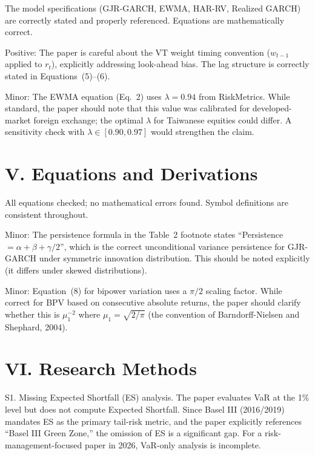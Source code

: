 \documentclass[12pt,a4paper]{article}
\begin{document}
The model specifications (GJR-GARCH, EWMA, HAR-RV, Realized GARCH) are correctly stated and properly referenced. Equations are mathematically correct.

\textcolor{okgreen}{Positive:} The paper is careful about the VT weight timing convention ($w_{t-1}$ applied to $r_t$), explicitly addressing look-ahead bias. The lag structure is correctly stated in Equations~(5)--(6).

Minor: The EWMA equation (Eq.~2) uses $\lambda = 0.94$ from RiskMetrics. While standard, the paper should note that this value was calibrated for developed-market foreign exchange; the optimal $\lambda$ for Taiwanese equities could differ. A sensitivity check with $\lambda \in [0.90, 0.97]$ would strengthen the claim.


\section*{V. Equations and Derivations}

All equations checked; no mathematical errors found. Symbol definitions are consistent throughout.

Minor: The persistence formula in the Table~2 footnote states ``Persistence $= \alpha + \beta + \gamma/2$'', which is the correct unconditional variance persistence for GJR-GARCH under symmetric innovation distribution. This should be noted explicitly (it differs under skewed distributions).

Minor: Equation~(8) for bipower variation uses a $\pi/2$ scaling factor. While correct for BPV based on consecutive absolute returns, the paper should clarify whether this is $\mu_1^{-2}$ where $\mu_1 = \sqrt{2/\pi}$ (the convention of Barndorff-Nielsen and Shephard, 2004).


\section*{VI. Research Methods}

\textcolor{errorred}{S1. Missing Expected Shortfall (ES) analysis.} The paper evaluates VaR at the 1\% level but does not compute Expected Shortfall. Since Basel III (2016/2019) mandates ES as the primary tail-risk metric, and the paper explicitly references ``Basel III Green Zone,'' the omission of ES is a significant gap. For a risk-management-focused paper in 2026, VaR-only analysis is incomplete.
\end{document}
